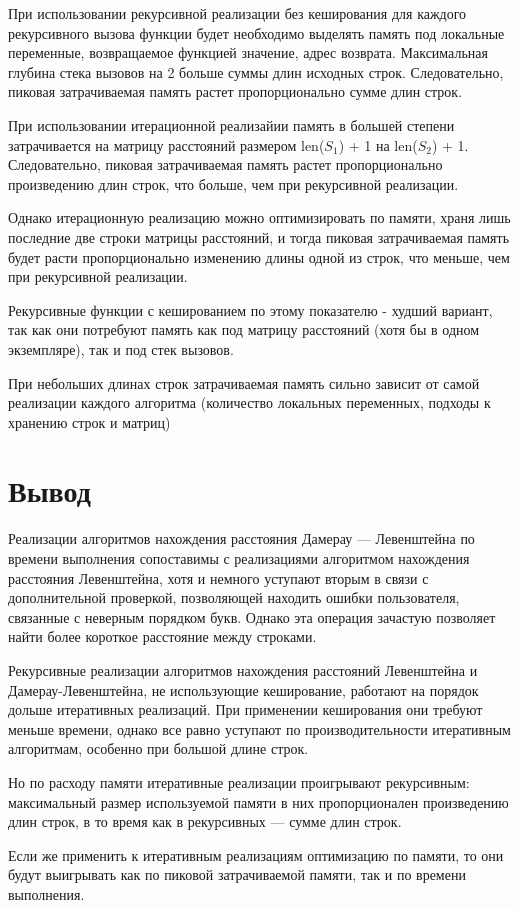 При использовании рекурсивной реализации без кеширования для каждого рекурсивного вызова функции будет необходимо выделять память под локальные переменные, возвращаемое функцией значение, адрес возврата. Максимальная глубина стека вызовов на 2 больше суммы длин исходных строк. Следовательно, пиковая затрачиваемая память растет пропорционально сумме длин строк. 

При использовании итерационной реализайии память в большей степени затрачивается на матрицу расстояний размером  len($S_{1}$) + 1 на len($S_{2}$) + 1. Следовательно, пиковая затрачиваемая память растет пропорционально произведению длин строк, что больше, чем при рекурсивной реализации.

Однако итерационную реализацию можно оптимизировать по памяти, храня лишь последние две строки матрицы расстояний, и тогда пиковая затрачиваемая память будет расти пропорционально изменению длины одной из строк, что меньше, чем при рекурсивной реализации.

Рекурсивные функции с кешированием по этому показателю - худший вариант, так как они потребуют память как под матрицу расстояний (хотя бы в одном экземпляре), так и под стек вызовов.

При небольших длинах строк затрачиваемая память сильно зависит от самой реализации каждого алгоритма (количество локальных переменных, подходы к хранению строк и матриц)

\section*{Вывод}

Реализации алгоритмов нахождения расстояния Дамерау — Левенштейна по времени выполнения сопоставимы с реализациями алгоритмом нахождения расстояния Левенштейна, хотя и немного уступают вторым в связи с дополнительной проверкой, позволяющей находить ошибки пользователя, связанные с неверным порядком букв. Однако эта операция зачастую позволяет найти более короткое расстояние между строками.

Рекурсивные реализации алгоритмов нахождения расстояний Левенштейна и Дамерау-Левенштейна, не использующие кеширование, работают на порядок дольше итеративных реализаций. При применении кеширования они требуют меньше времени, однако все равно уступают по производительности итеративным алгоритмам, особенно при большой длине строк. 

Но по расходу памяти итеративные реализации проигрывают рекурсивным: максимальный размер используемой памяти в них пропорционален произведению длин строк, в то время как в рекурсивных — сумме длин строк.

Если же применить к итеративным реализациям оптимизацию по памяти, то они будут выигрывать как по пиковой затрачиваемой памяти, так и по времени выполнения.
